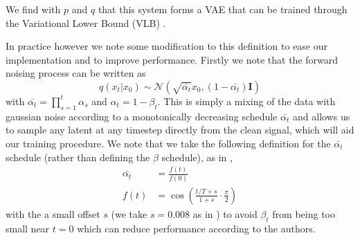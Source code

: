 We find with $p$ and $q$ that this system forms a VAE that can be trained through the Variational Lower Bound (VLB) \cite{kingma2022_VAE}.

In practice however we note some modification to this definition to ease our implementation and to improve performance.
Firstly we note that the forward noising process can be written as
\begin{equation}
    \label{eq:direct_noising_latents}
    q(x_t|x_0) \sim \mathcal{N}(\sqrt{\bar{\alpha_t}}x_0, (1-\bar{\alpha_t})\mathbf{I})
\end{equation}
with $\bar{\alpha_t} = \prod_{s=1}^t \alpha_s$ and $\alpha_t = 1 - \beta_t$. This is simply a mixing of the data with gaussian noise according to a monotonically decreasing schedule $\bar{\alpha_t}$ and allows us to sample any latent at any timestep directly from the clean signal, which will aid our training procedure. We note that we take the following definition for the $\bar{\alpha_t}$ schedule (rather than defining the $\beta$ schedule), as in \cite{improved_diffusion},
\begin{equation}
    \begin{aligned}
    \bar{\alpha_t} &= \frac{f(t)}{f(0)} \\
    f(t) &= \cos \left( \frac{t/T + s}{1 + s} \cdot \frac{\pi}{2} \right)
    \end{aligned}
\end{equation}
with the a small offset $s$ (we take $s=0.008$ as in \cite{improved_diffusion}) to avoid $\beta_t$ from being too small near $t=0$ which can reduce performance according to the authors.

